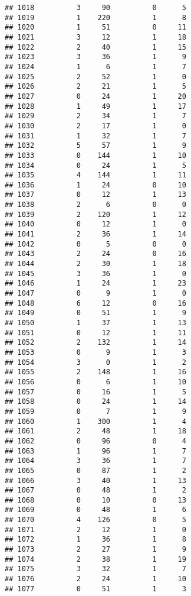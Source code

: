 \documentclass[]{article}
\begin{document}
\begin{verbatim}
## 1018          3     90          0      5
## 1019          1    220          1      8
## 1020          1     51          0     11
## 1021          3     12          1     18
## 1022          2     40          1     15
## 1023          3     36          1      9
## 1024          1      6          1      7
## 1025          2     52          1      0
## 1026          2     21          1      5
## 1027          0     24          1     20
## 1028          1     49          1     17
## 1029          2     34          1      7
## 1030          2     17          1      0
## 1031          1     32          1      7
## 1032          5     57          1      9
## 1033          0    144          1     10
## 1034          0     24          1      5
## 1035          4    144          1     11
## 1036          1     24          0     10
## 1037          0     12          1     13
## 1038          2      6          0      0
## 1039          2    120          1     12
## 1040          0     12          1      0
## 1041          2     36          1     14
## 1042          0      5          0      0
## 1043          2     24          0     16
## 1044          2     30          1     18
## 1045          3     36          1      0
## 1046          1     24          1     23
## 1047          0      9          1      0
## 1048          6     12          0     16
## 1049          0     51          1      9
## 1050          1     37          1     13
## 1051          0     12          1     11
## 1052          2    132          1     14
## 1053          0      9          1      3
## 1054          3      0          1      2
## 1055          2    148          1     16
## 1056          0      6          1     10
## 1057          0     16          1      5
## 1058          0     24          1     14
## 1059          0      7          1      9
## 1060          1    300          1      4
## 1061          2     48          1     18
## 1062          0     96          0      4
## 1063          1     96          1      7
## 1064          3     36          1      7
## 1065          0     87          1      2
## 1066          3     40          1     13
## 1067          0     48          1      2
## 1068          0     10          0     13
## 1069          0     48          1      6
## 1070          4    126          0      5
## 1071          2     12          1      0
## 1072          1     36          1      8
## 1073          2     27          1      9
## 1074          2     38          1     19
## 1075          3     32          1      7
## 1076          2     24          1     10
## 1077          0     51          1      3

\end{verbatim}
\end{document}
